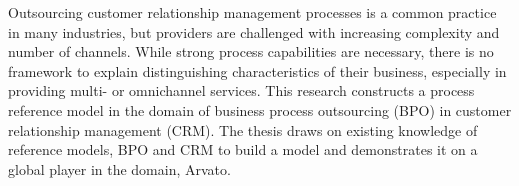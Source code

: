Outsourcing customer relationship management processes is a common practice in many industries, but providers are challenged with increasing complexity and number of channels. While strong process capabilities are necessary, there is no framework to explain distinguishing characteristics of their business, especially in providing multi- or omnichannel services. This research constructs a process reference model in the domain of business process outsourcing (BPO) in customer relationship management (CRM).
 The thesis draws on existing knowledge of reference models, BPO and CRM to build a model and demonstrates it on a global player in the domain, Arvato. 